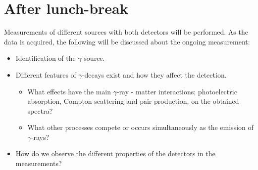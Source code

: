 \documentclass[12pt]{article}
\begin{document}
\section*{After lunch-break}
Measurements of different sources with both detectors will be performed. As the data is acquired, the following will be discussed about the ongoing measurement:
\begin{itemize}
  \item Identification of the $\gamma$ source.
  \item Different features of $\gamma$-decays exist and how they affect the detection.
    \begin{itemize}
      \item What effects have the main $\gamma$-ray - matter interactions; photoelectric absorption, Compton scattering and pair production, on the obtained spectra?
      \item What other processes compete or occurs simultaneously as the emission of $\gamma$-rays?
    \end{itemize}
  \item How do we observe the different properties of the detectors in the measurements?
\end{itemize}
\end{document}
